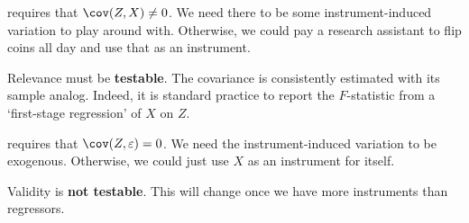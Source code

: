 \documentclass[10pt]{article}
\begin{document}
\begin{definition}
	 requires that $\cov(Z,X) \ne 0$. We need there to be some instrument-induced variation to play around with. Otherwise, we could pay a research assistant to flip coins all day and use that as an instrument. 
	
	Relevance must be \textbf{testable}. The covariance is consistently estimated with its sample analog. Indeed, it is standard practice to report the $F$-statistic from a `first-stage regression' of $X$ on $Z$.
\end{definition}

\begin{definition}
	 requires that $\cov(Z,\varepsilon) = 0$. We need the instrument-induced variation to be exogenous. Otherwise, we could just use $X$ as an instrument for itself. 
	
	Validity is \textbf{not testable}. This will change once we have more instruments than regressors.
\end{definition}
\end{document}

